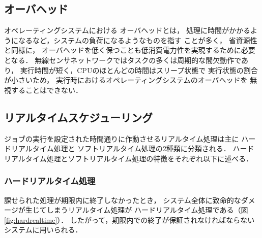 \subsection{オーバヘッド}
オペレーティングシステムにおける
オーバヘッドとは，
処理に時間がかかるようになるなど，システムの負荷になるようなものを指す
ことが多く，
省資源性と同様に，
オーバヘッドを低く保つことも低消費電力性を実現するために必要となる．
無線センサネットワークではタスクの多くは周期的な間欠動作であり，
実行時間が短く，CPUのほとんどの時間はスリープ状態で
実行状態の割合が小さいため，
実行時におけるオペレーティングシステムのオーバヘッドを
無視することはできない．





\subsection{リアルタイムスケジューリング}
ジョブの実行を設定された時間通りに作動させるリアルタイム処理は主に
ハードリアルタイム処理と
ソフトリアルタイム処理の2種類に分類される．
ハードリアルタイム処理とソフトリアルタイム処理の特徴をそれぞれ以下に述べる．


\subsubsection{ハードリアルタイム処理}

\vspace{0.5em}課せられた処理が期限内に終了しなかったとき，
システム全体に致命的なダメージが生じてしまうリアルタイム処理が
ハードリアルタイム処理である（図\ref{fig:hardrealtime}）．
したがって，期限内での終了が保証されなければならないシステムに用いられる．

